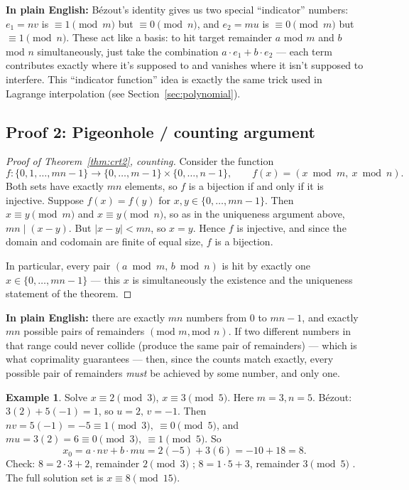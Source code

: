 \documentclass[11pt]{article}
\theoremstyle{definition}
\newtheorem{example}[theorem]{Example}
\theoremstyle{remark}
\begin{document}
\noindent\textbf{In plain English:} Bézout's identity gives us two special ``indicator'' numbers: $e_1 = nv$ is $\equiv 1 \pmod m$ but $\equiv 0 \pmod n$, and $e_2 = mu$ is $\equiv 0\pmod m$ but $\equiv 1\pmod n$. These act like a basis: to hit target remainder $a$ mod $m$ and $b$ mod $n$ simultaneously, just take the combination $a\cdot e_1 + b\cdot e_2$ — each term contributes exactly where it's supposed to and vanishes where it isn't supposed to interfere. This ``indicator function'' idea is exactly the same trick used in Lagrange interpolation (see Section~\ref{sec:polynomial}).

\subsection{Proof 2: Pigeonhole / counting argument}

\begin{proof}[Proof of Theorem~\ref{thm:crt2}, counting]
Consider the function
\[
f : \{0, 1, \dots, mn-1\} \longrightarrow \{0,\dots,m-1\} \times \{0,\dots,n-1\}, \qquad f(x) = (x \bmod m,\ x \bmod n).
\]
Both sets have exactly $mn$ elements, so $f$ is a bijection if and only if it is injective. Suppose $f(x) = f(y)$ for $x,y \in \{0,\dots,mn-1\}$. Then $x \equiv y \pmod m$ and $x\equiv y\pmod n$, so as in the uniqueness argument above, $mn \mid (x-y)$. But $|x - y| < mn$, so $x = y$. Hence $f$ is injective, and since the domain and codomain are finite of equal size, $f$ is a bijection.

In particular, every pair $(a \bmod m,\, b\bmod n)$ is hit by exactly one $x \in \{0,\dots,mn-1\}$ — this $x$ is simultaneously the existence and the uniqueness statement of the theorem.
\end{proof}

\noindent\textbf{In plain English:} there are exactly $mn$ numbers from $0$ to $mn-1$, and exactly $mn$ possible pairs of remainders $(\text{mod } m, \text{mod } n)$. If two different numbers in that range could never collide (produce the same pair of remainders) — which is what coprimality guarantees — then, since the counts match exactly, every possible pair of remainders \emph{must} be achieved by some number, and only one.

\begin{example}\label{ex:first}
Solve $x \equiv 2 \pmod 3$, $x \equiv 3 \pmod 5$. Here $m=3,n=5$. Bézout: $3(2) + 5(-1) = 1$, so $u=2,\,v=-1$. Then $nv = 5(-1) = -5 \equiv 1 \pmod 3,\ \equiv 0\pmod5$, and $mu = 3(2)=6 \equiv 0\pmod3,\ \equiv1\pmod5$. So
\[
x_0 = a\cdot nv + b\cdot mu = 2(-5) + 3(6) = -10 + 18 = 8.
\]
Check: $8 = 2\cdot3+2$, remainder $2\pmod3$ \checkmark; $8 = 1\cdot5+3$, remainder $3\pmod5$ \checkmark. The full solution set is $x \equiv 8 \pmod{15}$.
\end{example}
\end{document}
